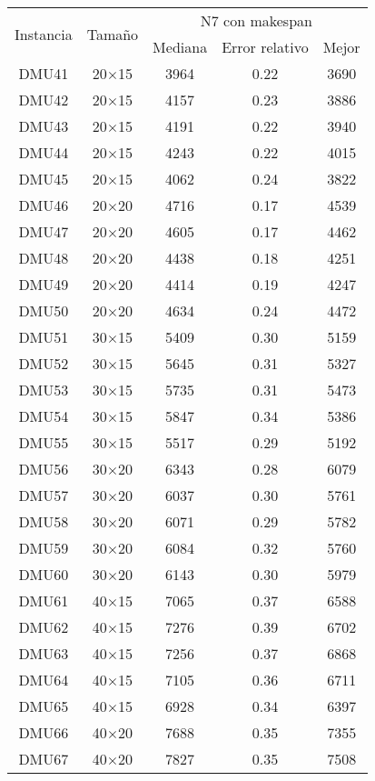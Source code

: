 \begin{table}[H]
\centering
\begin{tabular}{@{}ccccc@{}}
\toprule
\multirow{2}{*}{Instancia} & \multirow{2}{*}{Tamaño} & \multicolumn{3}{c}{N7 con makespan} \\ \cmidrule(lr){3-5}
& & Mediana& Error relativo & Mejor  \\ \midrule
DMU41 & 20$\times$15 & 3964 & 0.22 & 3690\\ 
DMU42 & 20$\times$15 & 4157 & 0.23 & 3886\\ 
DMU43 & 20$\times$15 & 4191 & 0.22 & 3940\\ 
DMU44 & 20$\times$15 & 4243 & 0.22 & 4015\\ 
DMU45 & 20$\times$15 & 4062 & 0.24 & 3822\\ 
DMU46 & 20$\times$20 & 4716 & 0.17 & 4539\\ 
DMU47 & 20$\times$20 & 4605 & 0.17 & 4462\\ 
DMU48 & 20$\times$20 & 4438 & 0.18 & 4251\\ 
DMU49 & 20$\times$20 & 4414 & 0.19 & 4247\\ 
DMU50 & 20$\times$20 & 4634 & 0.24 & 4472\\ 
DMU51 & 30$\times$15 & 5409 & 0.30 & 5159\\ 
DMU52 & 30$\times$15 & 5645 & 0.31 & 5327\\ 
DMU53 & 30$\times$15 & 5735 & 0.31 & 5473\\ 
DMU54 & 30$\times$15 & 5847 & 0.34 & 5386\\ 
DMU55 & 30$\times$15 & 5517 & 0.29 & 5192\\ 
DMU56 & 30$\times$20 & 6343 & 0.28 & 6079\\ 
DMU57 & 30$\times$20 & 6037 & 0.30 & 5761\\ 
DMU58 & 30$\times$20 & 6071 & 0.29 & 5782\\ 
DMU59 & 30$\times$20 & 6084 & 0.32 & 5760\\ 
DMU60 & 30$\times$20 & 6143 & 0.30 & 5979\\ 
DMU61 & 40$\times$15 & 7065 & 0.37 & 6588\\ 
DMU62 & 40$\times$15 & 7276 & 0.39 & 6702\\ 
DMU63 & 40$\times$15 & 7256 & 0.37 & 6868\\ 
DMU64 & 40$\times$15 & 7105 & 0.36 & 6711\\ 
DMU65 & 40$\times$15 & 6928 & 0.34 & 6397\\ 
DMU66 & 40$\times$20 & 7688 & 0.35 & 7355\\ 
DMU67 & 40$\times$20 & 7827 & 0.35 & 7508\\ 

\end{tabular}
\end{table}
